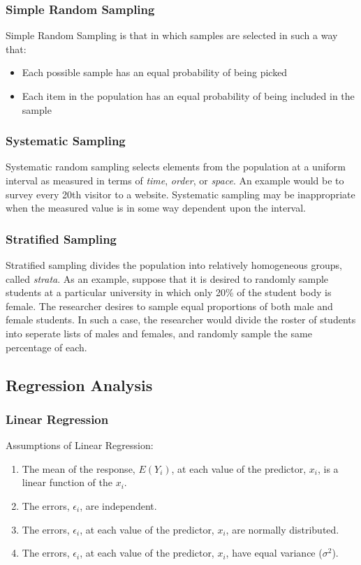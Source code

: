 \documentclass[12pt]{article}
\begin{document}
\subsubsection{Simple Random Sampling}
Simple Random Sampling is that in which samples are selected in such a way that:
\begin{itemize} 
\item Each possible sample has an equal probability of being picked
\item Each item in the population has an equal probability of being included in the sample
\end{itemize}
\subsubsection{Systematic Sampling}
Systematic random sampling selects elements from the population at a uniform interval as measured in terms of \textit{time}, \textit{order}, or \textit{space}. An example would be to survey every 20th visitor to a website.
Systematic sampling may be inappropriate when the measured value is in some way dependent upon the interval. 
\subsubsection{Stratified Sampling}
Stratified sampling divides the population into relatively homogeneous groups, called \textit{strata}. As an example, suppose that it is desired to randomly sample students at a particular university in which only 20\% of the student body is female. The researcher desires to sample equal proportions of both male and female students. In such a case, the researcher would divide the roster of students into seperate lists of males and females, and randomly sample the same percentage of each.

\subsection{Regression Analysis}
\subsubsection{Linear Regression}
Assumptions of Linear Regression:
\begin{enumerate}
\item The mean of the response, $E(Y_i)$, at each value of the predictor, $x_i$, is a linear function of the $x_i$.
\item The errors, $\epsilon_i$, are independent.
\item The errors, $\epsilon_i$, at each value of the predictor, $x_i$, are normally distributed.
\item The errors, $\epsilon_i$, at each value of the predictor, $x_i$, have equal variance ($\sigma^2$).
\end{enumerate}
\end{document}
